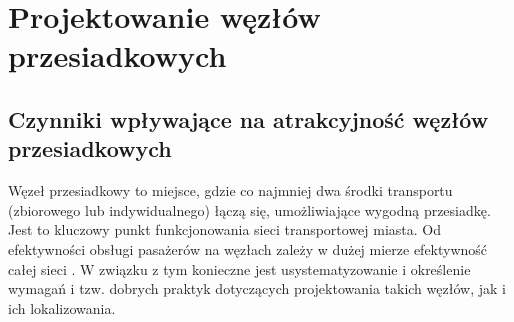 \documentclass[twoside,12pt]{article}
\begin{document}
\section{Projektowanie węzłów przesiadkowych}

	\subsection{Czynniki wpływające na atrakcyjność węzłów przesiadkowych}

	Węzeł przesiadkowy to miejsce, gdzie co najmniej dwa środki transportu (zbiorowego lub indywidualnego) łączą się, umożliwiające wygodną przesiadkę. Jest to kluczowy punkt funkcjonowania sieci transportowej miasta. Od efektywności obsługi pasażerów na węzłach zależy w dużej mierze efektywność całej sieci \cite{urbanistyka}. W związku z tym konieczne jest usystematyzowanie i określenie wymagań i tzw. dobrych praktyk dotyczących projektowania takich węzłów, jak i ich lokalizowania. 
	
\end{document}
